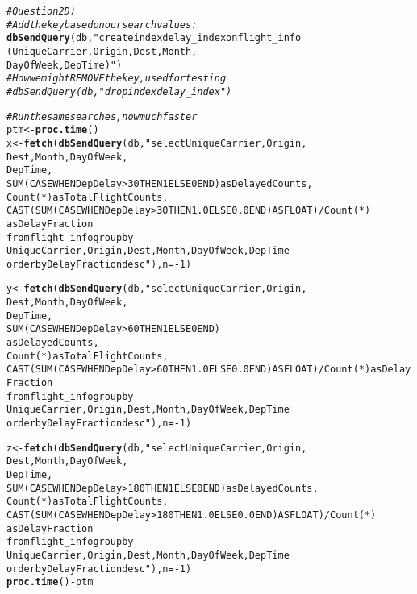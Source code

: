 \documentclass{article}\usepackage[]{graphicx}\usepackage[]{color}
\makeatletter
\newcommand{\hlnum}[1]{\textcolor[rgb]{0.686,0.059,0.569}{#1}}%
\newcommand{\hlstr}[1]{\textcolor[rgb]{0.192,0.494,0.8}{#1}}%
\newcommand{\hlcom}[1]{\textcolor[rgb]{0.678,0.584,0.686}{\textit{#1}}}%
\newcommand{\hlopt}[1]{\textcolor[rgb]{0,0,0}{#1}}%
\newcommand{\hlstd}[1]{\textcolor[rgb]{0.345,0.345,0.345}{#1}}%
\newcommand{\hlkwb}[1]{\textcolor[rgb]{0.69,0.353,0.396}{#1}}%
\newcommand{\hlkwc}[1]{\textcolor[rgb]{0.333,0.667,0.333}{#1}}%
\newcommand{\hlkwd}[1]{\textcolor[rgb]{0.737,0.353,0.396}{\textbf{#1}}}%
\newenvironment{kframe}{%
 \def\at@end@of@kframe{}%
 \ifinner\ifhmode%
  \def\at@end@of@kframe{\end{minipage}}%
  \begin{minipage}{\columnwidth}%
 \fi\fi%
 \def\FrameCommand##1{\hskip\@totalleftmargin \hskip-\fboxsep
 \colorbox{shadecolor}{##1}\hskip-\fboxsep
     \hskip-\linewidth \hskip-\@totalleftmargin \hskip\columnwidth}%
 \MakeFramed {\advance\hsize-\width
   \@totalleftmargin\z@ \linewidth\hsize
   \@setminipage}}%
 {\par\unskip\endMakeFramed%
 \at@end@of@kframe}
\newenvironment{knitrout}{}{} %
\makeatother
\begin{document}
\begin{knitrout}
\color{fgcolor}\begin{kframe}
\begin{alltt}
\hlcom{# Question 2D)}
\hlcom{# Add the key based on our search values:}
\hlkwd{dbSendQuery}\hlstd{(db,} \hlstr{"create index delay_index on flight_info
            (UniqueCarrier, Origin, Dest, Month, 
            DayOfWeek, DepTime)"}\hlstd{)}
\hlcom{# How we might REMOVE the key, used for testing}
\hlcom{# dbSendQuery(db, "drop index delay_index")}

\hlcom{# Run the same searches, now much faster}
\hlstd{ptm} \hlkwb{<-} \hlkwd{proc.time}\hlstd{()}
\hlstd{x} \hlkwb{<-} \hlkwd{fetch}\hlstd{(}\hlkwd{dbSendQuery}\hlstd{(db,} \hlstr{"select UniqueCarrier, Origin, 
                       Dest, Month, DayOfWeek, 
                       DepTime,
                       SUM(CASE WHEN DepDelay > 30 THEN 1 ELSE 0 END) as DelayedCounts, 
                       Count(*) as TotalFlightCounts,
                       CAST(SUM(CASE WHEN DepDelay > 30 THEN 1.0 ELSE 0.0 END) AS FLOAT) / Count(*) 
                       as DelayFraction
                       from flight_info group by
                       UniqueCarrier, Origin, Dest, Month, DayOfWeek, DepTime
                       order by DelayFraction desc"}\hlstd{),}\hlkwc{n}\hlstd{=}\hlopt{-}\hlnum{1}\hlstd{)}

\hlstd{y} \hlkwb{<-} \hlkwd{fetch}\hlstd{(}\hlkwd{dbSendQuery}\hlstd{(db,} \hlstr{"select UniqueCarrier, Origin, 
                       Dest, Month, DayOfWeek, 
                       DepTime,
                       SUM(CASE WHEN DepDelay > 60 THEN 1 ELSE 0 END) 
                       as DelayedCounts, 
                       Count(*) as TotalFlightCounts,
                       CAST(SUM(CASE WHEN DepDelay > 60 THEN 1.0 ELSE 0.0 END) AS FLOAT) / Count(*) as DelayFraction
                       from flight_info group by
                       UniqueCarrier, Origin, Dest, Month, DayOfWeek, DepTime
                       order by DelayFraction desc"}\hlstd{),}\hlkwc{n}\hlstd{=}\hlopt{-}\hlnum{1}\hlstd{)}

\hlstd{z} \hlkwb{<-} \hlkwd{fetch}\hlstd{(}\hlkwd{dbSendQuery}\hlstd{(db,} \hlstr{"select UniqueCarrier, Origin, 
                       Dest, Month, DayOfWeek, 
                       DepTime,
                       SUM(CASE WHEN DepDelay > 180 THEN 1 ELSE 0 END) as DelayedCounts, 
                       Count(*) as TotalFlightCounts,
                       CAST(SUM(CASE WHEN DepDelay > 180 THEN 1.0 ELSE 0.0 END) AS FLOAT) / Count(*) 
                       as DelayFraction
                       from flight_info group by
                       UniqueCarrier, Origin, Dest, Month, DayOfWeek, DepTime
                       order by DelayFraction desc"}\hlstd{),}\hlkwc{n}\hlstd{=}\hlopt{-}\hlnum{1}\hlstd{)}
\hlkwd{proc.time}\hlstd{()} \hlopt{-} \hlstd{ptm}
\end{alltt}
\end{kframe}
\end{knitrout}
\end{document}
